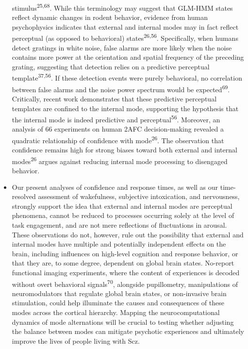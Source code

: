\documentclass[
]{article}
\begin{document}
\begin{itemize}
  stimulus\textsuperscript{25,68}. While this terminology may suggest
  that GLM-HMM states reflect dynamic changes in rodent behavior,
  evidence from human psychophysics indicates that external and internal
  modes may in fact reflect perceptual (as opposed to behavioral)
  states\textsuperscript{26,56}. Specifically, when humans detect
  gratings in white noise, false alarms are more likely when the noise
  contains more power at the orientation and spatial frequency of the
  preceding grating, suggesting that detection relies on a predictive
  perceptual template\textsuperscript{37,56}. If these detection events
  were purely behavioral, no correlation between false alarms and the
  noise power spectrum would be expected\textsuperscript{69}.
  Critically, recent work demonstrates that these predictive perceptual
  templates are confined to the internal mode, supporting the hypothesis
  that the internal mode is indeed predictive and
  perceptual\textsuperscript{56}. Moreover, an analysis of 66
  experiments on human 2AFC decision-making revealed a quadratic
  relationship of confidence with mode\textsuperscript{26}. The
  observation that confidence remains high for strong biases toward both
  external and internal modes\textsuperscript{26} argues against
  reducing internal mode processing to disengaged behavior.
\item
  Our present analyses of confidence and response times, as well as our
  time-resolved assessment of wakefulness, subjective intoxication, and
  nervousness, strongly support the idea that external and internal
  modes are perceptual phenomena, cannot be reduced to processes
  occurring solely at the level of task engagement, and are not mere
  reflections of fluctuations in arousal. These observations do not,
  however, rule out the possibility that external and internal modes
  have multiple and potentially independent effects on the brain,
  including influences on high-level cognition and response behavior, or
  that they are, to some degree, dependent on global brain states.
  No-report functional imaging experiments, where the content of
  experiences is decoded without overt behavioral
  signals\textsuperscript{70}, alongside pupillometry, manipulations of
  neuromodulators that regulate global brain states, or non-invasive
  brain stimulation, could help illuminate the causes and consequences
  of these modes across the cortical hierarchy. Mapping the
  neurocomputational dynamics of mode alternations will be crucial to
  testing whether adjusting the balance between modes can mitigate
  psychotic experiences and ultimately improve the lives of people
  living with Scz.
\end{itemize}
\end{document}
